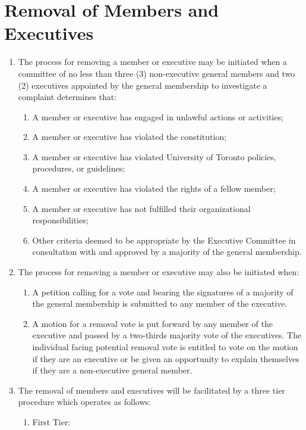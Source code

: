 \documentclass[12pt]{article}
\begin{document}
\section{Removal of Members and Executives}
\begin{enumerate}[{5}.1]
    \item The process for removing a member or executive may be initiated when a committee of no less than three (3) non-executive general members and two (2) executives appointed by the general membership to investigate a complaint determines that:
    \begin{enumerate}[{5.1}.1]
        \item	A member or executive has engaged in unlawful actions or activities;
        \item	A member or executive has violated the constitution;
        \item	A member or executive has violated University of Toronto policies, procedures, or guidelines;
        \item	A member or executive has violated the rights of a fellow member;
        \item	A member or executive has not fulfilled their organizational responsibilities;
        \item	Other criteria deemed to be appropriate by the Executive Committee in consultation with and approved by a majority of the general membership. 
    \end{enumerate}
    \item The process for removing a member or executive may also be initiated when:
    \begin{enumerate}[{5.2}.1]
        \item	A petition calling for a vote and bearing the signatures of a majority of the general membership is submitted to any member of the executive.
        \item A motion for a removal vote is put forward by any member of the executive and passed by a two-thirds majority vote of the executives.  The individual facing potential removal vote is entitled to vote on the motion if they are an executive or be given an opportunity to explain themselves if they are a non-executive general member.
    \end{enumerate}
    \item The removal of members and executives will be facilitated by a three tier procedure which operates as follows: 
    \begin{enumerate}[{5.3}.1]
        \item First Tier:

\end{enumerate}
\end{enumerate}
\end{document}
